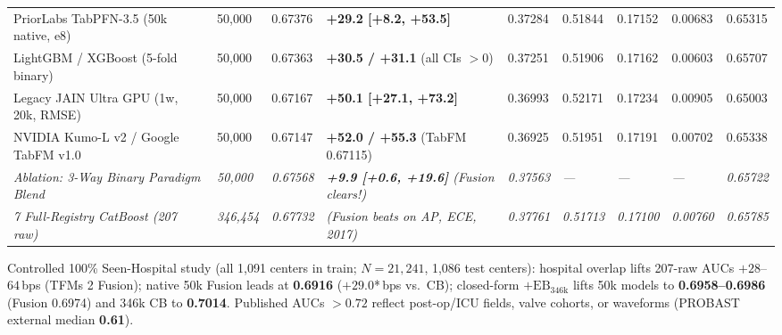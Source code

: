 \documentclass[8.5pt,letterpaper]{article}
\begin{document}
{\begin{tabularx}{\textwidth}{@{}Y R{1.00cm} R{1.06cm} R{2.85cm} R{1.00cm} R{1.02cm} R{0.96cm} R{0.96cm} R{1.00cm}@{}}
PriorLabs TabPFN-3.5 (50k native, e8) & 50,000 & 0.67376 & \textbf{+29.2 [+8.2, +53.5]} & 0.37284 & 0.51844 & 0.17152 & 0.00683 & 0.65315 \\
LightGBM / XGBoost (5-fold binary) & 50,000 & 0.67363 & \textbf{+30.5 / +31.1} (all CIs $>0$) & 0.37251 & 0.51906 & 0.17162 & 0.00603 & 0.65707 \\
Legacy JAIN Ultra GPU (1w, 20k, RMSE) & 50,000 & 0.67167 & \textbf{+50.1 [+27.1, +73.2]} & 0.36993 & 0.52171 & 0.17234 & 0.00905 & 0.65003 \\
NVIDIA Kumo-L v2 / Google TabFM v1.0 & 50,000 & 0.67147 & \textbf{+52.0 / +55.3} (TabFM 0.67115) & 0.36925 & 0.51951 & 0.17191 & 0.00702 & 0.65338 \\
\midrule
\textit{Ablation: 3-Way Binary Paradigm Blend} & \textit{50,000} & \textit{0.67568} & \textit{\textbf{+9.9 [+0.6, +19.6]} (Fusion clears!)} & \textit{0.37563} & \textit{---} & \textit{---} & \textit{---} & \textit{0.65722} \\
\textit{7\x{} Full-Registry CatBoost (207 raw)} & \textit{346,454} & \textit{0.67732} & \textit{ (Fusion beats on AP, ECE, 2017)} & \textit{0.37761} & \textit{0.51713} & \textit{0.17100} & \textit{0.00760} & \textit{0.65785} \\
\bottomrule
\end{tabularx}}
\vspace{1.2pt}
{\noindent\sffamily\fontsize{6.0}{7.4}\selectfont\color{sub}Controlled 100\% Seen-Hospital study (all 1,091 centers in train; $N{=}21{,}241$, 1,086 test centers): hospital overlap lifts 207-raw AUCs $+28$--$64$\,bps (TFMs 2\x{} Fusion); native 50k  Fusion leads at \textbf{0.6916} ($+29.0$*\,bps vs.\ CB); closed-form $+\mathrm{EB}_{346\mathrm{k}}$ lifts 50k models to \textbf{0.6958--0.6986} (Fusion 0.6974) and 346k CB to \textbf{0.7014}. Published AUCs $>0.72$ reflect post-op/ICU fields, valve cohorts, or waveforms (PROBAST external median \textbf{0.61}).\par}

\vspace{3.8pt}
\end{document}
